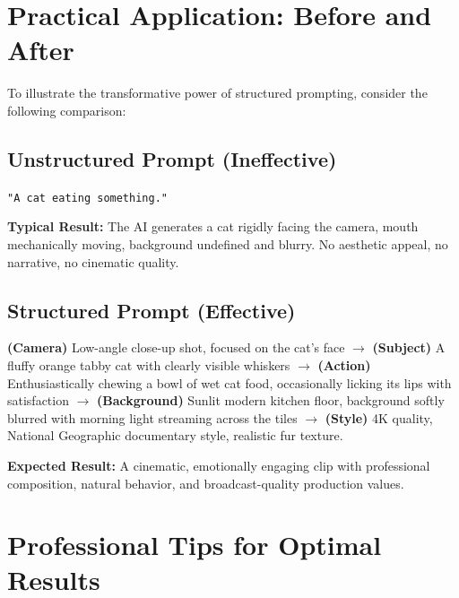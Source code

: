 \section{Practical Application: Before and After}
\label{sec:before-after}

To illustrate the transformative power of structured prompting, consider the following comparison:

\subsection{Unstructured Prompt (Ineffective)}

\begin{warnbox}
\texttt{"A cat eating something."}
\end{warnbox}

\textbf{Typical Result:} The AI generates a cat rigidly facing the camera, mouth mechanically moving, background undefined and blurry. No aesthetic appeal, no narrative, no cinematic quality.

\subsection{Structured Prompt (Effective)}

\begin{resultbox}
\small
\textbf{(Camera)} Low-angle close-up shot, focused on the cat's face $\rightarrow$ \textbf{(Subject)} A fluffy orange tabby cat with clearly visible whiskers $\rightarrow$ \textbf{(Action)} Enthusiastically chewing a bowl of wet cat food, occasionally licking its lips with satisfaction $\rightarrow$ \textbf{(Background)} Sunlit modern kitchen floor, background softly blurred with morning light streaming across the tiles $\rightarrow$ \textbf{(Style)} 4K quality, National Geographic documentary style, realistic fur texture.
\end{resultbox}

\textbf{Expected Result:} A cinematic, emotionally engaging clip with professional composition, natural behavior, and broadcast-quality production values.

\section{Professional Tips for Optimal Results}
\label{sec:pro-tips}

